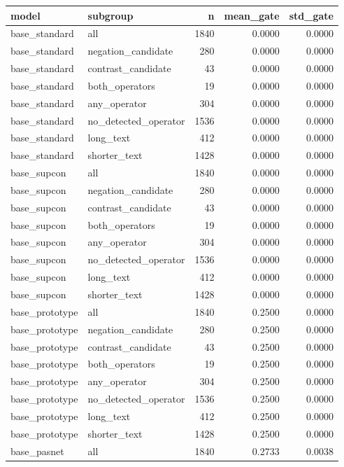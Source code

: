 \begin{tabular}{llrrr}
\toprule
model & subgroup & n & mean\_gate & std\_gate \\
\midrule
base\_standard & all & 1840 & 0.0000 & 0.0000 \\
base\_standard & negation\_candidate & 280 & 0.0000 & 0.0000 \\
base\_standard & contrast\_candidate & 43 & 0.0000 & 0.0000 \\
base\_standard & both\_operators & 19 & 0.0000 & 0.0000 \\
base\_standard & any\_operator & 304 & 0.0000 & 0.0000 \\
base\_standard & no\_detected\_operator & 1536 & 0.0000 & 0.0000 \\
base\_standard & long\_text & 412 & 0.0000 & 0.0000 \\
base\_standard & shorter\_text & 1428 & 0.0000 & 0.0000 \\
base\_supcon & all & 1840 & 0.0000 & 0.0000 \\
base\_supcon & negation\_candidate & 280 & 0.0000 & 0.0000 \\
base\_supcon & contrast\_candidate & 43 & 0.0000 & 0.0000 \\
base\_supcon & both\_operators & 19 & 0.0000 & 0.0000 \\
base\_supcon & any\_operator & 304 & 0.0000 & 0.0000 \\
base\_supcon & no\_detected\_operator & 1536 & 0.0000 & 0.0000 \\
base\_supcon & long\_text & 412 & 0.0000 & 0.0000 \\
base\_supcon & shorter\_text & 1428 & 0.0000 & 0.0000 \\
base\_prototype & all & 1840 & 0.2500 & 0.0000 \\
base\_prototype & negation\_candidate & 280 & 0.2500 & 0.0000 \\
base\_prototype & contrast\_candidate & 43 & 0.2500 & 0.0000 \\
base\_prototype & both\_operators & 19 & 0.2500 & 0.0000 \\
base\_prototype & any\_operator & 304 & 0.2500 & 0.0000 \\
base\_prototype & no\_detected\_operator & 1536 & 0.2500 & 0.0000 \\
base\_prototype & long\_text & 412 & 0.2500 & 0.0000 \\
base\_prototype & shorter\_text & 1428 & 0.2500 & 0.0000 \\
base\_pasnet & all & 1840 & 0.2733 & 0.0038 \\

\end{tabular}
